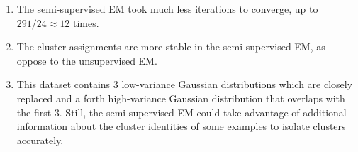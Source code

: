 \begin{answer}
\begin{enumerate}
\item The semi-supervised EM took much less iterations to converge, up to $291/24 \approx 12$ times.
\item The cluster assignments are more stable in the semi-supervised EM, as oppose to the unsupervised EM.
\item This dataset contains 3 low-variance Gaussian distributions which are closely replaced and a forth high-variance Gaussian distribution that overlaps with the first 3. Still, the semi-supervised EM could take advantage of additional information about the cluster identities of some examples to isolate clusters accurately.
\end{enumerate}
\end{answer}
